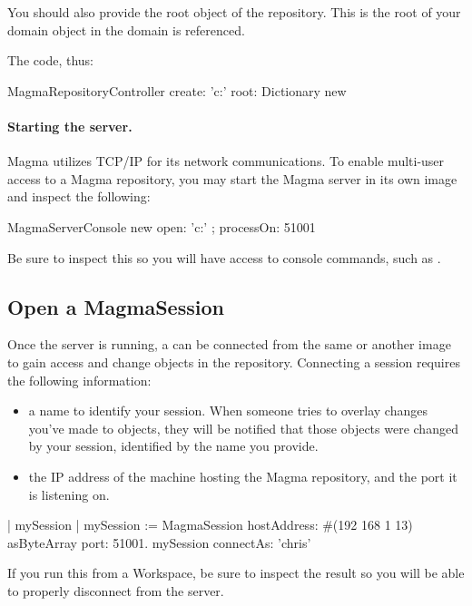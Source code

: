 \documentclass[a4paper,10pt,twoside]{book}
\begin{document}
You should also provide the root object of the repository. This is the root of your domain object in the domain is referenced.

The code, thus:

\begin{code}{}
	MagmaRepositoryController
		create: 'c:\myMagmaFolder'
		root: Dictionary new
\end{code}

\paragraph{Starting the server.}

Magma utilizes TCP/IP for its network communications. To enable multi-user access to a Magma repository, you may start the Magma server in its own image and inspect the following:

\begin{code}{}
MagmaServerConsole new
	open: 'c:\myMagmaFolder' ;
	processOn: 51001
\end{code}

Be sure to inspect this so you will have access to console commands, such as .

\subsection{Open a MagmaSession}

Once the server is running, a  can be connected from the same or another image to gain access and change objects in the repository. Connecting a session requires the following information:

\begin{itemize}
	\item a name to identify your session. When someone tries to overlay changes you've made to objects, they will be notified that those objects were changed by your session, identified by the name you provide.
	\item the IP address of the machine hosting the Magma repository, and the port it is listening on.
\end{itemize}

\begin{code}{}
	| mySession |
	mySession := MagmaSession
		hostAddress: #(192 168 1 13) asByteArray
		port: 51001.
	mySession connectAs: 'chris'
\end{code}
If you run this from a Workspace, be sure to inspect the result so you will be able to properly disconnect from the server.
\end{document}
